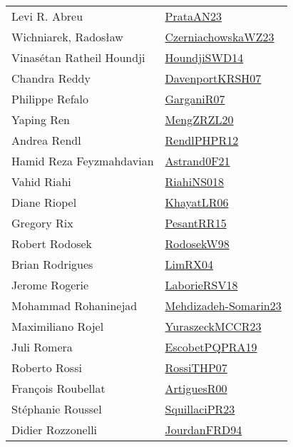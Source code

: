 {\begin{longtable}{p{4cm}p{20cm}}
Levi R. Abreu & \href{articles/PrataAN23.pdf}{PrataAN23}\cite{PrataAN23} \\
Wichniarek, Radosław & \href{articles/CzerniachowskaWZ23.pdf}{CzerniachowskaWZ23}\cite{CzerniachowskaWZ23} \\
Vinas{\'{e}}tan Ratheil Houndji & \href{papers/HoundjiSWD14.pdf}{HoundjiSWD14}\cite{HoundjiSWD14} \\
Chandra Reddy & \href{papers/DavenportKRSH07.pdf}{DavenportKRSH07}\cite{DavenportKRSH07} \\
Philippe Refalo & \href{papers/GarganiR07.pdf}{GarganiR07}\cite{GarganiR07} \\
Yaping Ren & \href{articles/MengZRZL20.pdf}{MengZRZL20}\cite{MengZRZL20} \\
Andrea Rendl & \href{papers/RendlPHPR12.pdf}{RendlPHPR12}\cite{RendlPHPR12} \\
Hamid Reza Feyzmahdavian & \href{papers/Astrand0F21.pdf}{Astrand0F21}\cite{Astrand0F21} \\
Vahid Riahi & \href{papers/RiahiNS018.pdf}{RiahiNS018}\cite{RiahiNS018} \\
Diane Riopel & \href{articles/KhayatLR06.pdf}{KhayatLR06}\cite{KhayatLR06} \\
Gregory Rix & \href{papers/PesantRR15.pdf}{PesantRR15}\cite{PesantRR15} \\
Robert Rodosek & \href{papers/RodosekW98.pdf}{RodosekW98}\cite{RodosekW98} \\
Brian Rodrigues & \href{papers/LimRX04.pdf}{LimRX04}\cite{LimRX04} \\
Jerome Rogerie & \href{articles/LaborieRSV18.pdf}{LaborieRSV18}\cite{LaborieRSV18} \\
Mohammad Rohaninejad & \href{papers/Mehdizadeh-Somarin23.pdf}{Mehdizadeh-Somarin23}\cite{Mehdizadeh-Somarin23} \\
Maximiliano Rojel & \href{articles/YuraszeckMCCR23.pdf}{YuraszeckMCCR23}\cite{YuraszeckMCCR23} \\
Juli Romera & \href{articles/EscobetPQPRA19.pdf}{EscobetPQPRA19}\cite{EscobetPQPRA19} \\
Roberto Rossi & \href{papers/RossiTHP07.pdf}{RossiTHP07}\cite{RossiTHP07} \\
Fran{\c{c}}ois Roubellat & \href{articles/ArtiguesR00.pdf}{ArtiguesR00}\cite{ArtiguesR00} \\
St{\'{e}}phanie Roussel & \href{papers/SquillaciPR23.pdf}{SquillaciPR23}\cite{SquillaciPR23} \\
Didier Rozzonelli & \href{}{JourdanFRD94}\cite{JourdanFRD94} \\

\end{longtable}}
